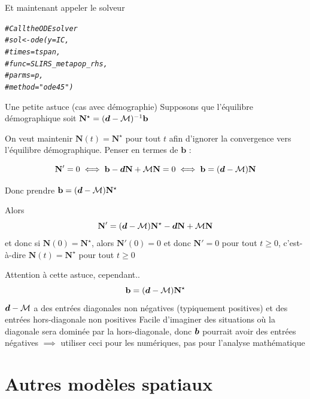 \documentclass[aspectratio=169]{beamer}\usepackage[]{graphicx}\usepackage[]{xcolor}
\makeatletter
\newcommand{\hlcom}[1]{\textcolor[rgb]{0.678,0.584,0.686}{\textit{#1}}}%
\newenvironment{kframe}{%
 \def\at@end@of@kframe{}%
 \ifinner\ifhmode%
  \def\at@end@of@kframe{\end{minipage}}%
  \begin{minipage}{\columnwidth}%
 \fi\fi%
 \def\FrameCommand##1{\hskip\@totalleftmargin \hskip-\fboxsep
 \colorbox{shadecolor}{##1}\hskip-\fboxsep
     \hskip-\linewidth \hskip-\@totalleftmargin \hskip\columnwidth}%
 \MakeFramed {\advance\hsize-\width
   \@totalleftmargin\z@ \linewidth\hsize
   \@setminipage}}%
 {\par\unskip\endMakeFramed%
 \at@end@of@kframe}
\newenvironment{knitrout}{}{} %
\makeatother
\begin{document}
\begin{frame}[fragile]{Et maintenant appeler le solveur}
\begin{knitrout}
\color{fgcolor}\begin{kframe}
\begin{alltt}
\hlcom{# Call the ODE solver}
\hlcom{# sol <- ode(y = IC,}
\hlcom{# 			times = tspan,}
\hlcom{# 			func = SLIRS_metapop_rhs,}
\hlcom{# 			parms = p,}
\hlcom{# 			method = "ode45")}
\end{alltt}
\end{kframe}
\end{knitrout}
\end{frame}
	
\begin{frame}[fragile]{Une petite astuce (cas avec démographie)}
	Supposons que l'équilibre démographique soit $\mathbf{N}^\star=(\bm{d}-\mathcal{M})^{-1}\mathbf{b}$

	On veut maintenir $\mathbf{N}(t)=\mathbf{N}^\star$ pour tout $t$ afin d'ignorer la convergence vers l'équilibre démographique. Penser en termes de $\mathbf{b}$ :
	
	$$
	\mathbf{N}'=0\iff \mathbf{b}-\bm{d}\mathbf{N}+\mathcal{M}\mathbf{N}=0 \iff \mathbf{b} = (\bm{d}-\mathcal{M})\mathbf{N}
	$$
	
	Donc prendre $\mathbf{b}=(\bm{d}-\mathcal{M})\mathbf{N}^\star$
	
	Alors
	$$
	\mathbf{N}' = (\bm{d}-\mathcal{M})\mathbf{N}^\star
	-\bm{d}\mathbf{N}+\mathcal{M}\mathbf{N}
	$$
	et donc si $\mathbf{N}(0)=\mathbf{N}^\star$, alors $\mathbf{N}'(0)=0$ et donc $\mathbf{N}'=0$ pour tout $t\geq 0$, c'est-à-dire $\mathbf{N}(t)=\mathbf{N}^\star$ pour tout $t\geq 0$
\end{frame}

\begin{frame}{Attention à cette astuce, cependant..}
$$
\mathbf{b}=(\bm{d}-\mathcal{M})\mathbf{N}^\star
$$
\vfill
$\bm{d}-\mathcal{M}$ a des entrées diagonales non négatives (typiquement positives) et des entrées hors-diagonale non positives
\vfill
Facile d'imaginer des situations où la diagonale sera dominée par la hors-diagonale, donc $\bm{b}$ pourrait avoir des entrées négatives
\vfill
$\implies$ utiliser ceci pour les numériques, pas pour l'analyse mathématique
\end{frame}


\section{Autres modèles spatiaux}
\end{document}
